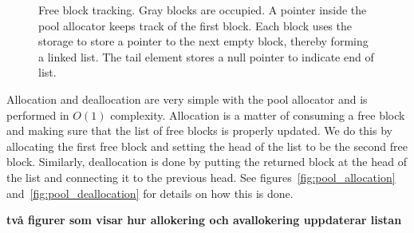 \documentclass{article}
\begin{document}
\begin{figure}[h]
    \centering
    \caption{Free block tracking. Gray blocks are occupied. A pointer inside the pool allocator keeps track of the first block. Each block uses the storage to store a pointer to the next empty block, thereby forming a linked list. The tail element stores a null pointer to indicate end of list.}
    \label{fig:pool_free_blocks}
\end{figure}

Allocation and deallocation are very simple with the pool allocator and is performed in $O(1)$ complexity. Allocation is a matter of consuming a free block and making sure that the list of free blocks is properly updated. We do this by allocating the first free block and setting the head of the list to be the second free block. Similarly, deallocation is done by putting the returned block at the head of the list and connecting it to the previous head. See figures~\ref{fig:pool_allocation} and~\ref{fig:pool_deallocation} for details on how this is done.

\textbf{\large två figurer som visar hur allokering och avallokering uppdaterar listan}
\end{document}
